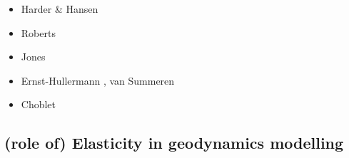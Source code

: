 \begin{scriptsize}
\begin{itemize}
\item[\twothousandfive] Harder \& Hansen \cite{haha05}
\item[\twothousandnine] Roberts \etal \cite{rolm09}
\item[\twothousandeleven] Jones \cite{jone11}
\item[\twothousandthirteen] Ernst-Hullermann \etal \cite{erhh13}, van Summeren \etal \cite{vagc13}
\item[\twothousandsixteen] Choblet \etal \cite{chah16}
\end{itemize}
\end{scriptsize}

\subsection{(role of) Elasticity in geodynamics modelling}


